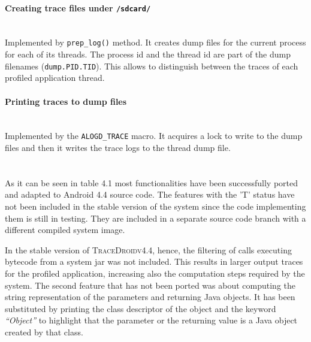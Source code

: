 \paragraph{Creating trace files under \texttt{/sdcard/}} ~\\
Implemented by \texttt{prep\_log()} method. It creates dump files for
the current process for each of its threads. The process id and the
thread id are part of the dump filenames (\texttt{dump.PID.TID}). This
allows to distinguish between the traces of each profiled application
thread.

\paragraph{Printing traces to dump files} ~\\
Implemented by the \texttt{ALOGD\_TRACE} macro. It acquires a lock to
write to the dump files and then it writes the trace logs to the
thread dump file.

\paragraph{} ~\\
As it can be seen in table 4.1 most functionalities have been
successfully ported and adapted to Android 4.4 source code. The
features with the 'T' status have not been included in the stable
version of the system since the code implementing them is still in
testing. They are included in a separate source code branch with a
different compiled system image.

In the stable version of \textsc{TraceDroidv4.4}, hence, the filtering of calls
executing bytecode from a system jar was not included. This results in
larger output traces for the profiled application, increasing
also the computation steps required by the system. The second feature
that has not been ported was about computing the string representation
of the parameters and returning Java objects. It has been substituted
by printing the class descriptor of the object and the keyword
\textit{“Object”} to highlight that the parameter or the returning value is a
Java object created by that class.
